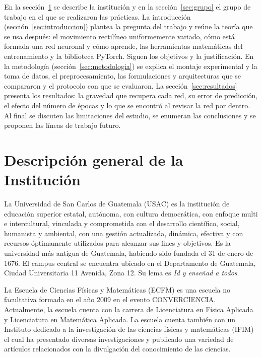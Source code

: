 \documentclass[titlepage,11pt]{article}
\begin{document}
En la sección~\ref{sec:institucion} se describe la institución y en la
sección~\ref{sec:grupo} el grupo de trabajo en el que se realizaron las
prácticas. La introducción (sección~\ref{sec:introduccion}) plantea la pregunta
del trabajo y reúne la teoría que se usa después: el movimiento rectilíneo
uniformemente variado, cómo está formada una red neuronal y cómo aprende, las
herramientas matemáticas del entrenamiento y la biblioteca PyTorch. Siguen los
objetivos y la justificación. En la metodología
(sección~\ref{sec:metodologia}) se explica el montaje experimental y la toma de
datos, el preprocesamiento, las formulaciones y arquitecturas que se compararon
y el protocolo con que se evaluaron. La sección~\ref{sec:resultados} presenta
los resultados: la gravedad que recupera cada red, su error de predicción, el
efecto del número de épocas y lo que se encontró al revisar la red por dentro.
Al final se discuten las limitaciones del estudio, se enumeran las conclusiones
y se proponen las líneas de trabajo futuro.

\newpage
\pagestyle{plain}
\tableofcontents
\newpage


\section{Descripción general de la Institución}
\label{sec:institucion}
La Universidad de San Carlos de Guatemala (USAC) es la institución de
educación superior estatal, autónoma, con cultura democrática, con enfoque
multi e intercultural, vinculada y comprometida con el desarrollo científico,
social, humanista y ambiental, con una gestión actualizada, dinámica, efectiva
y con recursos óptimamente utilizados para alcanzar sus fines y objetivos. Es
la universidad más antigua de Guatemala, habiendo sido fundada el 31 de enero
de 1676. El campus central se encuentra ubicado en el Departamento de
Guatemala, Ciudad Universitaria 11 Avenida, Zona 12. Su lema es \emph{Id y
  enseñad a todos}.

La Escuela de Ciencias Físicas y Matemáticas (ECFM) es una escuela no
facultativa formada en el año 2009 en el evento CONVERCIENCIA. Actualmente, la
escuela cuenta con la carrera de Licenciatura en Física Aplicada y
Licenciatura en Matemática Aplicada. La escuela cuenta también con un
Instituto dedicado a la investigación de las ciencias físicas y matemáticas
(IFIM) el cual ha presentado diversas investigaciones y publicado una variedad
de artículos relacionados con la divulgación del conocimiento de las ciencias.
\end{document}

